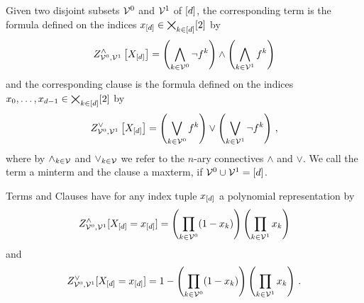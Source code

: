 
%


\begin{definition}
    \label{def:clauses}
    Given two disjoint subsets $\mathcal{V}^{0}$ and $\mathcal{V}^{1}$ of $[d]$, the corresponding term is the formula defined on the indices $x_{[d]}\in\bigtimes_{k\in[d]}[2]$ by
    \begin{align*}
        Z^{\land}_{\mathcal{V}^{0},\mathcal{V}^{1}}\left[X_{[d]}\right]
        =\left( \bigwedge_{k\in\mathcal{V}^{0}} \lnot f^{k} \right)  \land \left( \bigwedge_{k\in\mathcal{V}^{1}} f^{k} \right)
    \end{align*}
    and the corresponding clause is the formula defined on the indices $x_{0},\ldots,x_{d-1}\in\bigtimes_{k\in[d]}[2]$ by
    \begin{align*}
        Z^{\lor}_{\mathcal{V}^{0},\mathcal{V}^{1}}\left[X_{[d]}\right]
        =\left( \bigvee_{k\in\mathcal{V}^{0}} f^{k} \right)  \lor \left( \bigvee_{k\in\mathcal{V}^{1}} \lnot f^{k} \right)  \, ,
    \end{align*}
    where by $\land_{k\in\mathcal{V}}$ and $\lor_{k\in\mathcal{V}}$ we refer to the $n$-ary connectives $\land$ and $\lor$.
    We call the term a minterm and the clause a maxterm, if $\mathcal{V}^{0}\cup\mathcal{V}^{1} = [d]$.
\end{definition}

Terms and Clauses have for any index tuple $x_{[d]}$ a polynomial representation by
\[ Z^{\land}_{\mathcal{V}^{0},\mathcal{V}^{1}}[X_{[d]}=x_{[d]}]
= \left( \prod_{k \in \mathcal{V}^{0}} (1-x_{k}) \right)
\left(  \prod_{k \in \mathcal{V}^{1}} x_{k} \right) \]
and
\[ Z^{\lor}_{\mathcal{V}^{0},\mathcal{V}^{1}}[X_{[d]}=x_{[d]}]
= 1 - \left( \prod_{k \in \mathcal{V}^{0}} (1-x_{k})\right)
\left(  \prod_{k \in \mathcal{V}^{1}} x_{k} \right) \, . \]


